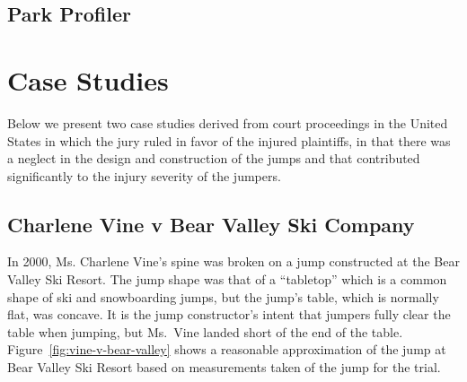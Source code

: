 \documentclass{article}
\begin{document}
\subsection{Park Profiler}
%

\section{Case Studies}
%
Below we present two case studies derived from court proceedings in the United
States in which the jury ruled in favor of the injured plaintiffs, in that
there was a neglect in the design and construction of the jumps and that
contributed significantly to the injury severity of the jumpers.

\subsection{Charlene Vine v Bear Valley Ski Company}
%
In 2000, Ms. Charlene Vine's spine was broken on a jump constructed at the Bear Valley
Ski Resort. The jump shape was that of a ``tabletop'' which is a common shape
of ski and snowboarding jumps, but the jump's table, which is normally flat,
was concave. It is the jump constructor's intent that jumpers fully clear the
table when jumping, but Ms.~Vine landed short of the end of the table.
Figure~\ref{fig:vine-v-bear-valley} shows a reasonable approximation of the
jump at Bear Valley Ski Resort based on measurements taken of the jump for the
trial.
\end{document}
